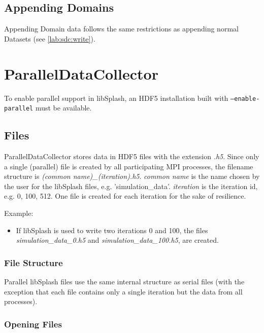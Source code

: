 \documentclass[a4paper,10pt,BCOR12mm]{report}
\newcommand{\code}[1]{\small \texttt{#1}}
\begin{document}
\section{Appending Domains}

Appending Domain data follows the same restrictions as appending normal Datasets (see \ref{lab:sdc:write}).



\chapter{ParallelDataCollector}

To enable parallel support in libSplash, an HDF5 installation built with \code{--enable-parallel}
must be available.


\section{Files}

ParallelDataCollector stores data in HDF5 files with the extension \emph{.h5}.
Since only a single (parallel) file is created by all participating MPI processes,
the filename structure is \emph{(common name)\_(iteration).h5}.
\emph{common name} is the name chosen by the user for the libSplash files, e.g.
'simulation\_data'.
\emph{iteration} is the iteration id, e.g. 0, 100, 512.
One file is created for each iteration for the sake of resilience.

Example:
\begin{itemize}
	\item If libSplash is used to write two iterations 0 and 100, the files
	\emph{simulation\_data\_0.h5} and \emph{simulation\_data\_100.h5}, are created.
\end{itemize}


\subsection{File Structure}

Parallel libSplash files use the same internal structure as serial files (with the exception
that each file contains only a single iteration but the data from all processes).


\subsection{Opening Files}
\end{document}
